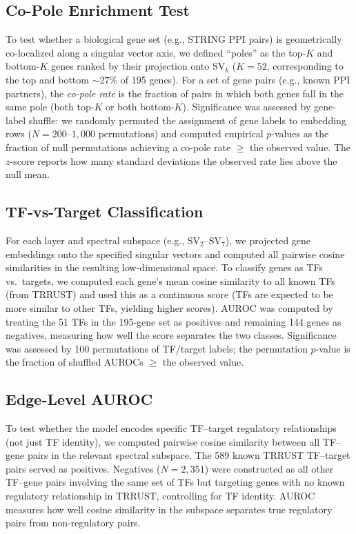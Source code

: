 \documentclass[10pt,twocolumn]{article}
\newcommand{\SV}[1]{\mathrm{SV}_{#1}}
\begin{document}
\subsection{Co-Pole Enrichment Test}
To test whether a biological gene set (e.g., STRING PPI pairs) is geometrically co-localized along a singular vector axis, we defined ``poles'' as the top-$K$ and bottom-$K$ genes ranked by their projection onto $\SV{k}$ ($K = 52$, corresponding to the top and bottom ${\sim}27\%$ of 195 genes).
For a set of gene pairs (e.g., known PPI partners), the \emph{co-pole rate} is the fraction of pairs in which both genes fall in the same pole (both top-$K$ or both bottom-$K$).
Significance was assessed by gene-label shuffle: we randomly permuted the assignment of gene labels to embedding rows ($N = 200$--$1{,}000$ permutations) and computed empirical $p$-values as the fraction of null permutations achieving a co-pole rate $\geq$ the observed value.
The $z$-score reports how many standard deviations the observed rate lies above the null mean.

\subsection{TF-vs-Target Classification}
\label{sec:methods_classification}
For each layer and spectral subspace (e.g., $\SV{2}$--$\SV{7}$), we projected gene embeddings onto the specified singular vectors and computed all pairwise cosine similarities in the resulting low-dimensional space.
To classify genes as TFs vs.\ targets, we computed each gene's mean cosine similarity to all known TFs (from TRRUST) and used this as a continuous score (TFs are expected to be more similar to other TFs, yielding higher scores).
AUROC was computed by treating the 51 TFs in the 195-gene set as positives and remaining 144 genes as negatives, measuring how well the score separates the two classes.
Significance was assessed by 100 permutations of TF/target labels; the permutation $p$-value is the fraction of shuffled AUROCs $\geq$ the observed value.

\subsection{Edge-Level AUROC}
To test whether the model encodes specific TF--target regulatory relationships (not just TF identity), we computed pairwise cosine similarity between all TF--gene pairs in the relevant spectral subspace.
The 589 known TRRUST TF--target pairs served as positives.
Negatives ($N = 2{,}351$) were constructed as all other TF--gene pairs involving the same set of TFs but targeting genes with no known regulatory relationship in TRRUST, controlling for TF identity.
AUROC measures how well cosine similarity in the subspace separates true regulatory pairs from non-regulatory pairs.
\end{document}
